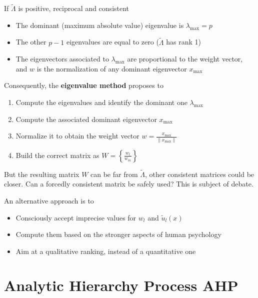 If $\tilde \Lambda$ is positive, reciprocal and consistent
\begin{itemize}
	\item The dominant (maximum absolute value) eigenvalue is $\lambda_{\max} = p$
	
	\item The other $p-1$ eigenvalues are equal to zero ($\tilde \Lambda$ has rank 1)
	
	\item The eigenvectors associated to $\lambda_{\max}$ are proportional to the weight vector, and $w$ is the normalization of any dominant eigenvector $x_{\max}$
\end{itemize}

Consequently, the \textbf{eigenvalue method} proposes to
\begin{enumerate}
	\item Compute the eigenvalues and identify the dominant one $\lambda_{\max}$
	
	\item Compute the associated dominant eigenvector $x_{\max}$
	
	\item Normalize it to obtain the weight vector $w = \frac{x_{{\max}}}{\|x_{\max}\|}$
	
	\item Build the correct matrix as $W = \left\{\frac{w_l}{w_m}\right\}$
\end{enumerate}

But the resulting matrix $W$ can be far from $\tilde \Lambda$, other consistent matrices could be closer. Can a forcedly consistent matrix be safely used? This is subject of debate.

An alternative approach is to 
\begin{itemize}
	\item Consciously accept imprecise values for $w_l$ and $\tilde u_l (x)$ 
	
	\item Compute them based on the stronger aspects of human psychology
	
	\item Aim at a qualitative ranking, instead of a quantitative one
\end{itemize}

\section{Analytic Hierarchy Process AHP}
\label{sec:ahp}


